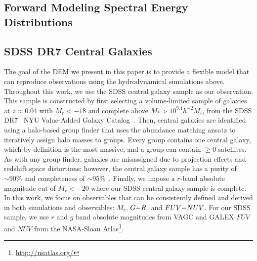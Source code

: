 \subsection{Forward Modeling Spectral Energy Distributions} \label{sec:fm} 

\subsection{SDSS DR7 Central Galaxies} \label{sec:obs} 
The goal of the DEM we present in this paper is to provide a flexible model
that can reproduce observations using the hydrodynamical simulations above. 
Throughout this work, we use the \cite{tinker2011} SDSS central galaxy sample 
as our observation. This sample is constructed by first selecting a
volume-limited sample of galaxies at $z \approx 0.04$ with $M_r < -18$ and
complete above $M_* > 10^{9.4} h^{-2}M_\odot$ from the SDSS
DR7~\citep{abazajian2009} NYU Value-Added Galaxy Catalog~\citep[VAGC;][]{blanton2005}. 
Then, central galaxies are identified using a halo-based group finder that
uses the abundance matching ansatz to iteratively assign halo masses to groups.
Every group contains one central galaxy, which by definition is the most
massive, and a group can contain $\ge0$ satellites.  As with any group finder,
galaxies are misassigned due to projection effects and redshift space
distortions; however, the central galaxy sample has a purity of ${\sim}90\%$
and completeness of ${\sim}95\%$~\citep{tinker2018}. Finally, we impose a
$r$-band absolute magnitude cut of $M_r < -20$ where our SDSS central galaxy 
sample is complete. In this work, we focus on observables that can be 
consistently defined and derived in both simulations and observables: 
$M_r$, $G{-}R$, and $FUV{-}NUV$. For our SDSS sample, we use $r$ and $g$ band 
absolute magnitudes from VAGC and GALEX $FUV$ and $NUV$ from the
NASA-Sloan Atlas\footnote{\url{http://nsatlas.org/}}. 

